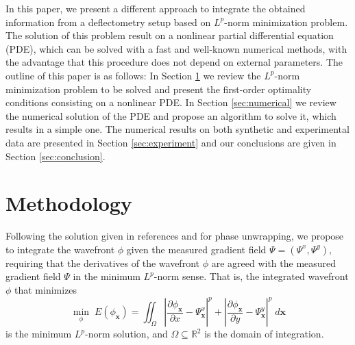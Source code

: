 \documentclass[12pt,letterpaper]{article}
\begin{document}
In this paper, we present a different approach to integrate the obtained information from a deflectometry setup based on $L^{p}$-norm minimization problem.  The solution of this problem result on a nonlinear partial differential equation (PDE), which can be solved with a fast and well-known numerical methods, with the advantage that this procedure does not depend on external parameters. The outline of this paper is as follows: In Section \ref{sec:metodo} we review the $L^{p}$-norm minimization problem to be solved and present the first-order optimality conditions consisting on a nonlinear PDE. In Section \ref{sec:numerical} we review the numerical solution of the PDE and propose an algorithm to solve it, which results in a simple one. The numerical results on both synthetic and experimental data are presented in Section \ref{sec:experiment} and our conclusions are given in Section \ref{sec:conclusion}.

\section{Methodology}\label{sec:metodo}
Following the solution given in references  and  for phase unwrapping, we propose to integrate the wavefront $\phi$ given the measured gradient field $\Psi = \left( \Psi^{x}, \Psi^{y}\right),$ requiring that the derivatives of the wavefront $\phi$ are agreed with the measured gradient field $\Psi$ in the minimum $L^{p}$-norm sense. That is, the integrated wavefront $\phi$ that minimizes
\begin{equation}\label{eq:funcional}
\underset{\phi}{\min}\; E(\phi_{\mathbf{x}}) = \iint_{\Omega}\left\lvert\frac{\partial\phi_{\mathbf{x}}}{\partial x} - \Psi_{\mathbf{x}}^{x}\right\rvert^{p} 
+ \left\lvert\frac{\partial\phi_{\mathbf{x}}}{\partial y} -\Psi_{\mathbf{x}}^{y}\right\rvert^{p}\;d\mathbf{x}
\end{equation}
is the minimum $L^{p}$-norm solution, and $\Omega \subseteq \mathbb{R}^{2}$ is the domain of integration.
\end{document}
